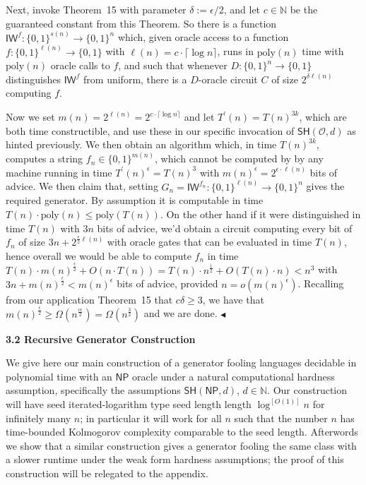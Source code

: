 Next, invoke Theorem 15 with parameter $\delta:=\epsilon/2$, and let $c\in\mathbb{N}$ be the guaranteed constant from this Theorem. So there is a function $\mathsf{IW}^{f}:\{0,1\}^{s(n)}\to\{0,1\}^{n}$ which, given oracle access to a function $f:\{0,1\}^{\ell(n)}\to\{0,1\}$ with $\ell(n)=c\cdot\lceil\log n\rceil$, runs in $\mathrm{poly}(n)$ time with $\mathrm{poly}(n)$ oracle calls to $f$, and such that whenever $D:\{0,1\}^{n}\to\{0,1\}$ distinguishes $\mathsf{IW}^{f}$ from uniform, there is a $D$-oracle circuit $C$ of size $2^{\delta\ell(n)}$ computing $f$.\par




Now we set $m(n)=2^{\ell(n)}=2^{c\cdot\lceil\log n\rceil}$ and let $T^{\prime}(n)=T(n)^{3k}$, which are both time constructible, and use these in our specific invocation of $\mathsf{SH}(\mathcal{O},d)$ as hinted previously. We then obtain an algorithm which, in time $T(n)^{3k}$, computes a string $f_{n}\in\{0,1\}^{m(n)}$, which cannot be computed by by any machine running in time $T^{\prime}(n)^{\epsilon}=T(n)^{3}$ with $m(n)^{\epsilon}=2^{\epsilon\cdot\ell(n)}$ bits of advice. We then claim that, setting $G_{n}=\mathsf{IW}^{f_{n}}:\{0,1\}^{\ell(n)}\to\{0,1\}^{n}$ gives the required generator. By assumption it is computable in time $T(n)\cdot\mathrm{poly}(n)\leq\mathrm{poly}(T(n))$. On the other hand if it were distinguished in time $T(n)$ with $3n$ bits of advice, we’d obtain a circuit computing every bit of $f_{n}$ of size $3n+2^{\frac{\epsilon}{2}\ell(n)}$ with oracle gates that can be evaluated in time $T(n)$, hence overall we would be able to compute $f_{n}$ in time $T(n)\cdot m(n)^{\frac{\epsilon}{2}}+O(n\cdot T(n))=T(n)\cdot n^{\frac{1}{2}}+O(T(n)\cdot n)<n^{3}$ with $3n+m(n)^{\frac{\epsilon}{2}}<m(n)^{\epsilon}$ bits of advice, provided $n=o(m(n)^{\epsilon})$. Recalling from our application Theorem 15 that $c\delta\geq 3$, we have that $m(n)^{\frac{\epsilon}{2}}\geq\Omega(n^{\frac{c\epsilon}{2}})=\Omega(n^{\frac{3}{2}})$ and we are done.
$\blacktriangleleft$\par






\par\medskip\noindent\textbf{
3.2 Recursive Generator Construction}\par




We give here our main construction of a generator fooling languages decidable in polynomial time with an ${\mathsf{NP}}$ oracle under a natural computational hardness assumption, specifically the assumptions $\mathsf{SH}({\mathsf{NP}},d)$, $d\in\mathbb{N}$. Our construction will have seed iterated-logarithm type seed length length $\log^{[O(1)]}n$ for infinitely many $n$; in particular it will work for all $n$ such that the number $n$ has time-bounded Kolmogorov complexity comparable to the seed length. Afterwords we show that a similar construction gives a generator fooling the same class with a slower runtime under the weak form hardness assumptions; the proof of this construction will be relegated to the appendix.\par



